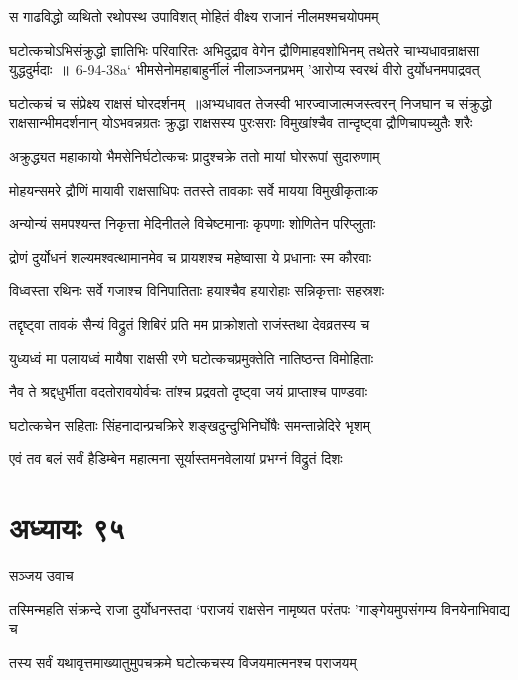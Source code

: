 \twolineshloka
{स गाढविद्धो व्यथितो रथोपस्थ उपाविशत्}
{मोहितं वीक्ष्य राजानं नीलमश्मचयोपमम्}


\fourlineindentedshloka
{घटोत्कचोऽभिसंक्रुद्धो ज्ञातिभिः परिवारितः}
{अभिदुद्राव वेगेन द्रौणिमाहवशोभिनम्}
{तथेतरे चाभ्यधावन्राक्षसा युद्धदुर्मदाः ॥ 6-94-38a` भीमसेनोमहाबाहुर्नीलं नीलाञ्जनप्रभम्}
{'आरोप्य स्वरथं वीरो दुर्योधनमपाद्रवत्}


घटोत्कचं च संप्रेक्ष्य राक्षसं घोरदर्शनम् ॥अभ्यधावत तेजस्वी भारज्वाजात्मजस्त्वरन्
\threelineshloka
{निजघान च संक्रुद्धो राक्षसान्भीमदर्शनान्}
{योऽभवन्नग्रतः क्रुद्धा राक्षसस्य पुरःसराः}
{विमुखांश्चैव तान्दृष्ट्वा द्रौणिचापच्युतैः शरैः}


\twolineshloka
{अक्रुद्ध्यत महाकायो भैमसेनिर्घटोत्कचः}
{प्रादुश्चक्रे ततो मायां घोररूपां सुदारुणाम्}


\twolineshloka
{मोहयन्समरे द्रौणिं मायावी राक्षसाधिपः}
{ततस्ते तावकाः सर्वे मायया विमुखीकृताःक}


\twolineshloka
{अन्योन्यं समपश्यन्त निकृत्ता मेदिनीतले}
{विचेष्टमानाः कृपणाः शोणितेन परिप्लुताः}


\twolineshloka
{द्रोणं दुर्योधनं शल्यमश्वत्थामानमेव च}
{प्रायशश्च महेष्वासा ये प्रधानाः स्म कौरवाः}


\twolineshloka
{विध्वस्ता रथिनः सर्वे गजाश्च विनिपातिताः}
{हयाश्चैव हयारोहाः सन्निकृत्ताः सहस्रशः}


\twolineshloka
{तद्दृष्ट्वा तावकं सैन्यं विद्रुतं शिबिरं प्रति}
{मम प्राक्रोशतो राजंस्तथा देवव्रतस्य च}


\twolineshloka
{युध्यध्वं मा पलायध्वं मायैषा राक्षसी रणे}
{घटोत्कचप्रमुक्तेति नातिष्ठन्त विमोहिताः}


\twolineshloka
{नैव ते श्रद्दधुर्भीता वदतोरावयोर्वचः}
{तांश्च प्रद्रवतो दृष्ट्वा जयं प्राप्ताश्च पाण्डवाः}


\twolineshloka
{घटोत्कचेन सहिताः सिंहनादान्प्रचक्रिरे}
{शङ्खदुन्दुभिनिर्घोषैः समन्तान्नेदिरे भृशम्}


\twolineshloka
{एवं तव बलं सर्वं हैडिम्बेन महात्मना}
{सूर्यास्तमनवेलायां प्रभग्नं विद्रुतं दिशः}


\chapter{अध्यायः ९५}
\twolineshloka
{सञ्जय उवाच}
{}


\threelineshloka
{तस्मिन्महति संक्रन्दे राजा दुर्योधनस्तदा}
{`पराजयं राक्षसेन नामृष्यत परंतपः}
{'गाङ्गेयमुपसंगम्य विनयेनाभिवाद्य च}


\twolineshloka
{तस्य सर्वं यथावृत्तमाख्यातुमुपचक्रमे}
{घटोत्कचस्य विजयमात्मनश्च पराजयम्}


